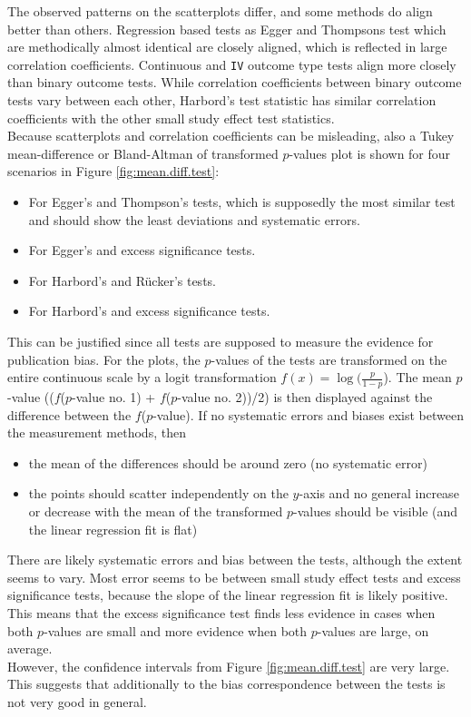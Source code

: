 \documentclass[11pt,a4paper,twoside]{book}\usepackage[]{graphicx}\usepackage[]{color}
\begin{document}
The observed patterns on the scatterplots differ, and some methods do align better than others. Regression based tests as Egger and Thompsons test which are methodically almost identical are closely aligned, which is reflected in large correlation coefficients. Continuous and \texttt{IV} outcome type tests align more closely than binary outcome tests. While correlation coefficients between binary outcome tests vary between each other, Harbord's test statistic has similar correlation coefficients with the other small study effect test statistics.\\
Because scatterplots and correlation coefficients can be misleading, also a Tukey mean-difference or Bland-Altman of transformed $p$-values plot is shown for four scenarios in Figure \ref{fig:mean.diff.test}:
\begin{itemize}
\item For Egger's and Thompson's tests, which is supposedly the most similar test and should show the least deviations and systematic errors.
\item For Egger's and excess significance tests.
\item For Harbord's and R\"ucker's tests.
\item For Harbord's and excess significance tests.
\end{itemize}

This can be justified since all tests are supposed to measure the evidence for publication bias. For the plots, the $p$-values of the tests are transformed on the entire continuous scale by a logit transformation $f(x)  = \log(\frac{p}{1-p}$). The mean $p$-value (($f$($p$-value no. 1) + $f$($p$-value no. 2))/2) is then displayed against the difference between the $f$($p$-value). If no systematic errors and biases exist between the measurement methods, then 

\begin{itemize}
\item the mean of the differences should be around zero (no systematic error) 
\item the points should scatter independently on the $y$-axis and no general increase or decrease with the mean of the transformed $p$-values should be visible (and the linear regression fit is flat)
\end{itemize}

There are likely systematic errors and bias between the tests, although the extent seems to vary. Most error seems to be between small study effect tests and excess significance tests, because the slope of the linear regression fit is likely positive. This means that the excess significance test finds less evidence in cases when both $p$-values are small and more evidence when both $p$-values are large, on average.\\
However, the confidence intervals from Figure \ref{fig:mean.diff.test} are very large. This suggests that additionally to the bias correspondence between the tests is not very good in general. 
\end{document}
